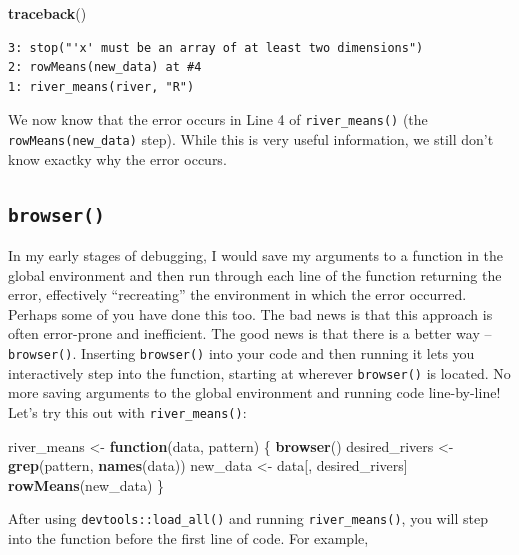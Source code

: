 \documentclass[
]{book}
\newenvironment{Shaded}{\begin{snugshade}}{\end{snugshade}}
\newcommand{\ControlFlowTok}[1]{\textcolor[rgb]{0.13,0.29,0.53}{\textbf{#1}}}
\newcommand{\KeywordTok}[1]{\textcolor[rgb]{0.13,0.29,0.53}{\textbf{#1}}}
\newcommand{\NormalTok}[1]{#1}
\newcommand{\StringTok}[1]{\textcolor[rgb]{0.31,0.60,0.02}{#1}}
\begin{document}
\begin{Shaded}
\begin{Highlighting}[]
\KeywordTok{traceback}\NormalTok{()}
\end{Highlighting}
\end{Shaded}

\begin{verbatim}
3: stop("'x' must be an array of at least two dimensions")
2: rowMeans(new_data) at #4
1: river_means(river, "R")
\end{verbatim}

We now know that the error occurs in Line 4 of \texttt{river\_means()} (the \texttt{rowMeans(new\_data)} step). While this is very useful information, we still don't know exactky why the error occurs.

\hypertarget{browser}{%
\subsection{\texorpdfstring{\texttt{browser()}}{browser()}}\label{browser}}

In my early stages of debugging, I would save my arguments to a function in the global environment and then run through each line of the function returning the error, effectively ``recreating'' the environment in which the error occurred. Perhaps some of you have done this too. The bad news is that this approach is often error-prone and inefficient. The good news is that there is a better way -- \texttt{browser()}. Inserting \texttt{browser()} into your code and then running it lets you interactively step into the function, starting at wherever \texttt{browser()} is located. No more saving arguments to the global environment and running code line-by-line! Let's try this out with \texttt{river\_means()}:

\begin{Shaded}
\begin{Highlighting}[]
\NormalTok{river_means <-}\StringTok{ }\ControlFlowTok{function}\NormalTok{(data, pattern) \{}
  \KeywordTok{browser}\NormalTok{()}
\NormalTok{  desired_rivers <-}\StringTok{ }\KeywordTok{grep}\NormalTok{(pattern, }\KeywordTok{names}\NormalTok{(data))}
\NormalTok{  new_data <-}\StringTok{ }\NormalTok{data[, desired_rivers]}
  \KeywordTok{rowMeans}\NormalTok{(new_data)}
\NormalTok{\}}
\end{Highlighting}
\end{Shaded}

After using \texttt{devtools::load\_all()} and running \texttt{river\_means()}, you will step into the function before the first line of code. For example,
\end{document}
